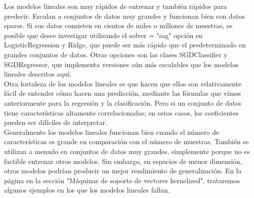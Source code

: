 { 
Los modelos lineales son muy rápidos de entrenar y también rápidos para predecir. Escalan a conjuntos de datos muy grandes y funcionan bien con datos sparse. Si sus datos consisten en cientos de miles  o millones de muestras, es posible que desee investigar utilizando el solver =  "{}sag"{} opción en {\ttfamily LogisticRegression} y {\ttfamily Ridge}, que puede ser más rápido que el predeterminado en grandes conjuntos de datos.  Otras opciones son las clases {\ttfamily SGDClassifier} y  {\ttfamily SGDRegressor}, que implementa versiones aún más escalables que  los modelos lineales descritos aquí.\\

Otra fortaleza de los modelos lineales es que hacen que ellos son relativamente fácil de entender
cómo  hacen una predicción, mediante las fórmulas que vimos anteriormente para la regresión y la clasificación.  Pero si un conjunto de datos tiene características altamente correlacionadas; en estos casos, los coeficientes pueden ser difíciles de interpretar.\\

Generalmente los modelos lineales funcionan bien cuando el número de características es grande en comparación con el número de muestras.  También se utilizan a menudo en conjuntos de datos muy grandes, simplemente porque no es factible entrenar otros modelos.  Sin embargo, en espacios de menor dimensión, otros modelos podrían producir un mejor rendimiento de generalización. En  la página \pageref{kenrelpag} en la sección  "Máquinas de soporte de vectores kernelized"{},  trataremos algunos ejemplos en los que los modelos lineales fallan.







\vspace{-2cm}	
\hspace{-1cm}
{}}
